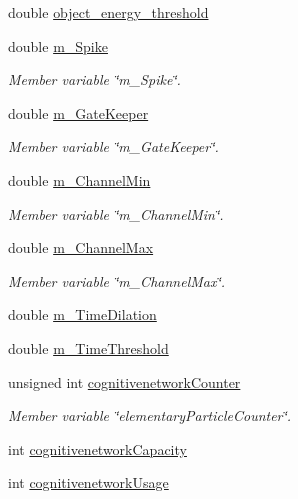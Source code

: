 \begin{DoxyCompactItemize}
double \mbox{\hyperlink{classCognitiveNetwork_a261409a3a19a76858743769605508278}{object\+\_\+energy\+\_\+threshold}}
\item 
double \mbox{\hyperlink{classCognitiveNetwork_a6fca1826ad4e0140cb1f1060891a3322}{m\+\_\+\+Spike}}
\begin{DoxyCompactList}\small\item\em Member variable \char`\"{}m\+\_\+\+Spike\char`\"{}. \end{DoxyCompactList}\item 
double \mbox{\hyperlink{classCognitiveNetwork_a790c699ecb3c98be0f3dada86f795e0b}{m\+\_\+\+Gate\+Keeper}}
\begin{DoxyCompactList}\small\item\em Member variable \char`\"{}m\+\_\+\+Gate\+Keeper\char`\"{}. \end{DoxyCompactList}\item 
double \mbox{\hyperlink{classCognitiveNetwork_a5571556d812abd789a682a606e6678c8}{m\+\_\+\+Channel\+Min}}
\begin{DoxyCompactList}\small\item\em Member variable \char`\"{}m\+\_\+\+Channel\+Min\char`\"{}. \end{DoxyCompactList}\item 
double \mbox{\hyperlink{classCognitiveNetwork_aceec291fd547c96cc0acdceb0b8ac395}{m\+\_\+\+Channel\+Max}}
\begin{DoxyCompactList}\small\item\em Member variable \char`\"{}m\+\_\+\+Channel\+Max\char`\"{}. \end{DoxyCompactList}\item 
double \mbox{\hyperlink{classCognitiveNetwork_a13ad3041f8dc46d58fd9ef6636fca04f}{m\+\_\+\+Time\+Dilation}}
\item 
double \mbox{\hyperlink{classCognitiveNetwork_adcdba17a98dffbbb12b199630d0cb83e}{m\+\_\+\+Time\+Threshold}}
\item 
unsigned int \mbox{\hyperlink{classCognitiveNetwork_ab4cfbf213ee21aeeb16d145d269aa377}{cognitivenetwork\+Counter}}
\begin{DoxyCompactList}\small\item\em Member variable \char`\"{}elementary\+Particle\+Counter\char`\"{}. \end{DoxyCompactList}\item 
int \mbox{\hyperlink{classCognitiveNetwork_a0a8f803f884cee0566bcd33ea9e0b01a}{cognitivenetwork\+Capacity}}
\item 
int \mbox{\hyperlink{classCognitiveNetwork_a7410505d26ebadbc1547deed3a2d7eaa}{cognitivenetwork\+Usage}}

\end{DoxyCompactItemize}
